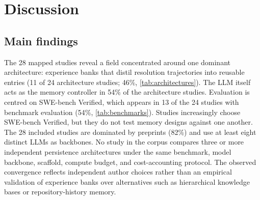 \section{Discussion}
\label{sec:discussion}


\subsection{Main findings}
\label{sec:principais-achados}

The 28 mapped studies reveal a field concentrated around one dominant
architecture: experience banks that distil resolution trajectories into
reusable entries (11 of 24 architecture studies; 46\%,
\autoref{tab:architectures}).
The LLM itself acts as the memory controller in 54\% of the
architecture studies.
Evaluation is centred on SWE-bench Verified, which appears in 13 of the
24 studies with benchmark evaluation (54\%, \autoref{tab:benchmarks}).
Studies increasingly choose SWE-bench Verified, but they do not test
memory designs against one another.
The 28 included studies are dominated by preprints (82\%) and use at
least eight distinct LLMs as backbones.
No study in the corpus compares three or more independent persistence
architectures under the same benchmark, model backbone, scaffold,
compute budget, and cost-accounting protocol.
The observed convergence reflects independent author choices rather
than an empirical validation of experience banks over alternatives such
as hierarchical knowledge bases or repository-history memory.


